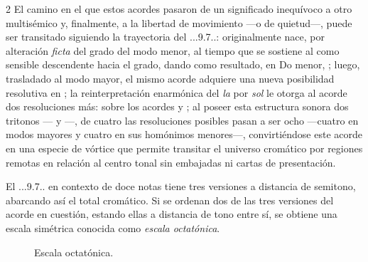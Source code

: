 \documentclass[a4paper,11pt]{article}
\begin{document}
\begin{multicols}{2}
El camino en el que estos acordes pasaron de un significado inequívoco a otro multisémico y, finalmente, a la libertad de movimiento ---o de quietud---, puede ser transitado siguiendo la trayectoria del \acorde.\Dohne..9\bemoltxt.7..: originalmente nace, por alteración \emph{ficta} del  grado del modo menor, al tiempo que se sostiene al  como sensible descendente hacia el  grado, dando como resultado, en Do menor, \hbox{;} luego, trasladado al modo mayor, el mismo acorde adquiere una nueva posibilidad resolutiva en \hbox{;} la reinterpretación enarmónica del \emph{la\bemoltxt} por \emph{sol\sostenidotxt} le otorga al acorde dos resoluciones más: sobre los acordes  y \hbox{;} al poseer esta estructura sonora dos tritonos --- y \hbox{---,} de cuatro las resoluciones posibles pasan a ser ocho ---cuatro en modos mayores y cuatro en sus homónimos menores---, convirtiéndose este acorde en una especie de vórtice que permite transitar el universo cromático por regiones remotas en relación al centro tonal sin embajadas ni cartas de presentación.

El \acorde.\Dohne..9\bemoltxt.7.. en contexto de doce notas tiene tres versiones a distancia de semitono, abarcando así el total cromático. Si se ordenan dos de las tres versiones del acorde en cuestión, estando ellas a distancia de tono entre sí, se obtiene una escala simétrica conocida como \emph{escala octatónica}.
\end{multicols}

\begin{figure}[ht]
\centering
\caption{Escala octatónica.}\label{fig:escala-octatonica}
\end{figure}
\end{document}
